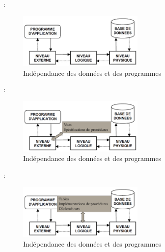 \documentclass[10pt]{beamer}
\begin{document}
\begin{frame}{\subsecname : \subsubsecname}
    \begin{figure}
        \begin{center}
            \includegraphics[width=0.55\textwidth]{../assets/img/par_sgbd_et_programme.jpg}
            \caption{Indépendance des données et des programmes}
            \label{Fig:par_sgbd_et_programme}
        \end{center}
    \end{figure}
\end{frame}

\begin{frame}{\subsecname : \subsubsecname}
    \begin{figure}
        \begin{center}
            \includegraphics[width=0.55\textwidth]{../assets/img/par_sgbd_et_programme--1.jpg}
            \caption{Indépendance des données et des programmes}
            \label{Fig:par_sgbd_et_programme--1}
        \end{center}
    \end{figure}
\end{frame}

\begin{frame}{\subsecname : \subsubsecname}
    \begin{figure}
        \begin{center}
            \includegraphics[width=0.55\textwidth]{../assets/img/par_sgbd_et_programme--2.jpg}
            \caption{Indépendance des données et des programmes}
            \label{Fig:par_sgbd_et_programme--2}
        \end{center}
    \end{figure}
\end{frame}
\end{document}
